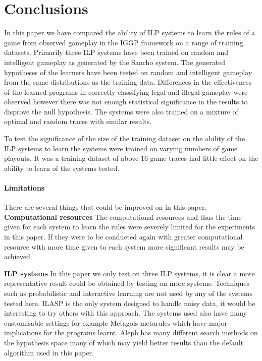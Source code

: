 \chapter{Conclusions}
In this paper we have compared the ability of ILP systems to learn the rules of a game from observed gameplay in the IGGP framework on a range of training datasets. Primarily three ILP systems have been trained on random and intelligent gameplay as generated by the Sancho system. The generated hypotheses of the learners have been tested on random and intelligent gameplay from the same distributions as the training data. Differences in the effectiveness of the learned programs in correctly classifying legal and illegal gameplay were observed however there was not enough statistical significance in the results to disprove the null hypothesis. The systems were also trained on a mixture of optimal and random traces with similar results.

To test the significance of the size of the training dataset on the ability of the ILP systems to learn the systems were trained on varying numbers of game playouts. It was a training dataset of above 16 game traces had little effect on the ability to learn of the systems tested. 

\subsubsection{Limitations}
There are several things that could be improved on in this paper.
\\

\textbf{Computational resources}
The computational resources and thus the time given for each system to learn the rules were severely limited for the experiments in this paper. If they were to be conducted again with greater computational resource with more time given to each system more significant results may be achieved

\textbf{ILP systems} In this paper we only test on three ILP systems, it is clear a more representative result could be obtained by testing on more systems. Techniques such as probabilistic\cite{Bellodi/Probablistic,Raedt/Probabalistic} and interactive\cite{Raedt/Interactive} learning are not used by any of the systems tested here. ILASP is the only system designed to handle noisy data\cite{MarkLaw/ILASP2i}, it would be interesting to try others with this approach\cite{Oblak/Noise,Evans/Noise}. The systems used also have many customisable settings for example Metagols metarules which have major implications for the programs learnt\cite{Cropper/Metarules}. Aleph has many different search methods on the hypothesis space many of which may yield better results than the default algorithm used in this paper.

